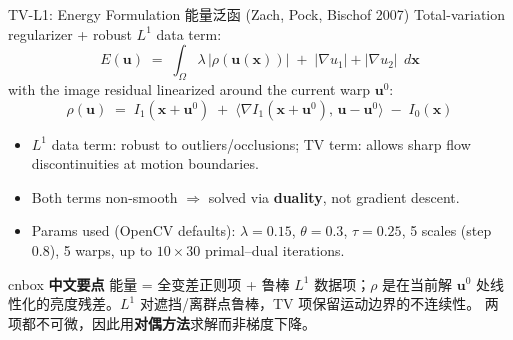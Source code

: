 \documentclass[aspectratio=169,10pt]{beamer}
\newcommand{\zh}[1]{{\zhfont #1}}
\newenvironment{cn}{%
  \begin{beamercolorbox}[rounded=true,sep=4pt,wd=\textwidth]{cnbox}\zhfont\footnotesize
  {\color{cblue!70!black}\textbf{中文要点}}\quad}%
  {\end{beamercolorbox}}
\begin{document}
\begin{frame}{TV-L1: Energy Formulation \zh{能量泛函}}
  {\small (Zach, Pock, Bischof 2007) Total-variation regularizer + robust $L^1$ data term:}
  \begin{equation*}
    E(\mathbf{u}) \;=\; \int_{\Omega}
      \lambda\,\bigl|\rho(\mathbf{u}(\mathbf{x}))\bigr|
      \;+\; |\nabla u_1| + |\nabla u_2| \;\, d\mathbf{x}
  \end{equation*}
  with the image residual linearized around the current warp $\mathbf{u}^0$:
  \begin{equation*}
    \rho(\mathbf{u}) \;=\; I_1(\mathbf{x}+\mathbf{u}^0)
      \;+\; \bigl\langle \nabla I_1(\mathbf{x}+\mathbf{u}^0),\,
            \mathbf{u}-\mathbf{u}^0 \bigr\rangle \;-\; I_0(\mathbf{x})
  \end{equation*}
  \begin{itemize}
    \item $L^1$ data term: robust to outliers/occlusions; TV term: allows sharp
      flow discontinuities at motion boundaries.
    \item Both terms non-smooth $\Rightarrow$ solved via \textbf{duality}, not
      gradient descent.
    \item Params used (OpenCV defaults): $\lambda=0.15$, $\theta=0.3$,
      $\tau=0.25$, 5 scales (step $0.8$), 5 warps, up to $10\times30$
      primal--dual iterations.
  \end{itemize}
  \vfill
  \begin{cn}
    能量 = 全变差正则项 + 鲁棒 $L^1$ 数据项；$\rho$ 是在当前解 $\mathbf{u}^0$
    处线性化的亮度残差。$L^1$ 对遮挡/离群点鲁棒，TV 项保留运动边界的不连续性。
    两项都不可微，因此用\textbf{对偶方法}求解而非梯度下降。
  \end{cn}
\end{frame}
\end{document}

